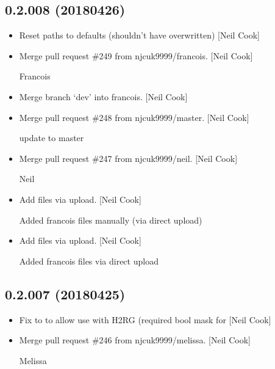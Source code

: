 \documentclass[a4paper,10pt,english]{report}
\begin{document}
\subsection{0.2.008 (2018\sphinxhyphen{}04\sphinxhyphen{}26)}
\label{\detokenize{misc/changelog:id471}}\begin{itemize}
\item {} 
Reset paths to defaults (shouldn’t have overwritten) {[}Neil Cook{]}

\item {} 
Merge pull request \#249 from njcuk9999/francois. {[}Neil Cook{]}

Francois

\item {} 
Merge branch ‘dev’ into francois. {[}Neil Cook{]}

\item {} 
Merge pull request \#248 from njcuk9999/master. {[}Neil Cook{]}

update to master

\item {} 
Merge pull request \#247 from njcuk9999/neil. {[}Neil Cook{]}

Neil

\item {} 
Add files via upload. {[}Neil Cook{]}

Added francois files manually (via direct upload)

\item {} 
Add files via upload. {[}Neil Cook{]}

Added francois files via direct upload

\end{itemize}


\subsection{0.2.007 (2018\sphinxhyphen{}04\sphinxhyphen{}25)}
\label{\detokenize{misc/changelog:id472}}\begin{itemize}
\item {} 
Fix to  to allow use with H2RG (required bool mask for
 {[}Neil Cook{]}

\item {} 
Merge pull request \#246 from njcuk9999/melissa. {[}Neil Cook{]}

Melissa

\end{itemize}
\end{document}
